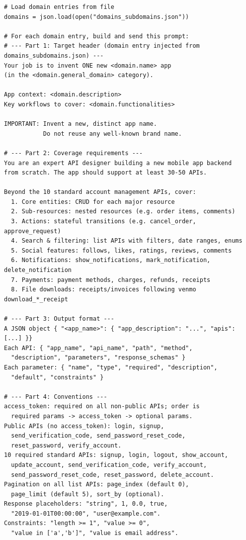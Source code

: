\documentclass[11pt]{article}
\begin{document}
\begin{lstlisting}[style=prompt,
  caption={Abbreviated structure of the Gemini prompt used for synthetic app generation. Domain entries are loaded from \texttt{domains\_subdomains.json} at runtime; \texttt{<domain.*>} placeholders are filled from the current entry. Ellipses (\texttt{...}) denote sections paraphrased for brevity.},
  label={lst:gemini_prompt}]
# Load domain entries from file
domains = json.load(open("domains_subdomains.json"))

# For each domain entry, build and send this prompt:
# --- Part 1: Target header (domain entry injected from domains_subdomains.json) ---
Your job is to invent ONE new <domain.name> app
(in the <domain.general_domain> category).

App context: <domain.description>
Key workflows to cover: <domain.functionalities>

IMPORTANT: Invent a new, distinct app name.
           Do not reuse any well-known brand name.

# --- Part 2: Coverage requirements ---
You are an expert API designer building a new mobile app backend
from scratch. The app should support at least 30-50 APIs.

Beyond the 10 standard account management APIs, cover:
  1. Core entities: CRUD for each major resource
  2. Sub-resources: nested resources (e.g. order items, comments)
  3. Actions: stateful transitions (e.g. cancel_order, approve_request)
  4. Search & filtering: list APIs with filters, date ranges, enums
  5. Social features: follows, likes, ratings, reviews, comments
  6. Notifications: show_notifications, mark_notification, delete_notification
  7. Payments: payment methods, charges, refunds, receipts
  8. File downloads: receipts/invoices following venmo download_*_receipt

# --- Part 3: Output format ---
A JSON object { "<app_name>": { "app_description": "...", "apis": [...] }}
Each API: { "app_name", "api_name", "path", "method",
  "description", "parameters", "response_schemas" }
Each parameter: { "name", "type", "required", "description",
  "default", "constraints" }

# --- Part 4: Conventions ---
access_token: required on all non-public APIs; order is
  required params -> access_token -> optional params.
Public APIs (no access_token): login, signup,
  send_verification_code, send_password_reset_code,
  reset_password, verify_account.
10 required standard APIs: signup, login, logout, show_account,
  update_account, send_verification_code, verify_account,
  send_password_reset_code, reset_password, delete_account.
Pagination on all list APIs: page_index (default 0),
  page_limit (default 5), sort_by (optional).
Response placeholders: "string", 1, 0.0, true,
  "2019-01-01T00:00:00", "user@example.com".
Constraints: "length >= 1", "value >= 0",
  "value in ['a','b']", "value is email address".


\end{lstlisting}
\end{document}
